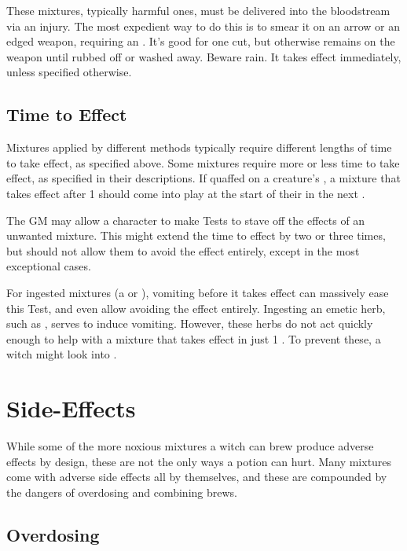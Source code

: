 These mixtures, typically harmful ones, must be delivered into the bloodstream via an injury.
The most expedient way to do this is to smear it on an arrow or an edged weapon, requiring an {\action}.
It's good for one cut, but otherwise remains on the weapon until rubbed off or washed away.
Beware rain.
It takes effect immediately, unless specified otherwise.


\subsection{Time to Effect}

Mixtures applied by different methods typically require different lengths of time to take effect, as specified above.
Some mixtures require more or less time to take effect, as specified in their descriptions.
If quaffed on a creature's {\turn}, a mixture that takes effect after 1 {\round} should come into play at the start of their {\turn} in the next {\round}.

The GM may allow a character to make  Tests to stave off the effects of an unwanted mixture.
This might extend the time to effect by two or three times, but should not allow them to avoid the effect entirely, except in the most exceptional cases.

For ingested mixtures (a  or ), vomiting before it takes effect can massively ease this  Test, and even allow avoiding the effect entirely.
Ingesting an emetic herb, such as , serves to induce vomiting.
However, these herbs do not act quickly enough to help with a mixture that takes effect in just 1 {\round}.
To prevent these, a witch might look into .

\section{Side-Effects}

While some of the more noxious mixtures a witch can brew produce adverse effects by design, these are not the only ways a potion can hurt.
Many mixtures come with adverse side effects all by themselves, and these are compounded by the dangers of overdosing and combining brews.

\subsection{Overdosing}

